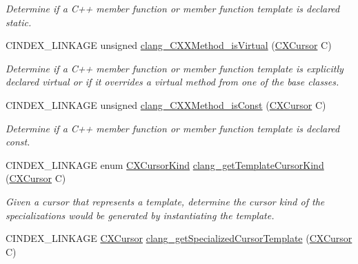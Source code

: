 \begin{DoxyCompactItemize}
\begin{DoxyCompactList}\small\item\em Determine if a C++ member function or member function template is declared \textquotesingle{}static\textquotesingle{}. \end{DoxyCompactList}\item 
\mbox{\label{group__CINDEX__CPP_gacd412f761b0622d6ea873f2ab21812e3}} 
C\+I\+N\+D\+E\+X\+\_\+\+L\+I\+N\+K\+A\+GE unsigned \mbox{\hyperlink{group__CINDEX__CPP_gacd412f761b0622d6ea873f2ab21812e3}{clang\+\_\+\+C\+X\+X\+Method\+\_\+is\+Virtual}} (\mbox{\hyperlink{structCXCursor}{C\+X\+Cursor}} C)
\begin{DoxyCompactList}\small\item\em Determine if a C++ member function or member function template is explicitly declared \textquotesingle{}virtual\textquotesingle{} or if it overrides a virtual method from one of the base classes. \end{DoxyCompactList}\item 
\mbox{\label{group__CINDEX__CPP_ga89a96f6eaae57508edc968611ac8969e}} 
C\+I\+N\+D\+E\+X\+\_\+\+L\+I\+N\+K\+A\+GE unsigned \mbox{\hyperlink{group__CINDEX__CPP_ga89a96f6eaae57508edc968611ac8969e}{clang\+\_\+\+C\+X\+X\+Method\+\_\+is\+Const}} (\mbox{\hyperlink{structCXCursor}{C\+X\+Cursor}} C)
\begin{DoxyCompactList}\small\item\em Determine if a C++ member function or member function template is declared \textquotesingle{}const\textquotesingle{}. \end{DoxyCompactList}\item 
C\+I\+N\+D\+E\+X\+\_\+\+L\+I\+N\+K\+A\+GE enum \mbox{\hyperlink{group__CINDEX_gaaccc432245b4cd9f2d470913f9ef0013}{C\+X\+Cursor\+Kind}} \mbox{\hyperlink{group__CINDEX__CPP_gafe1f32ddd935c20f0f455d47c05ec5ab}{clang\+\_\+get\+Template\+Cursor\+Kind}} (\mbox{\hyperlink{structCXCursor}{C\+X\+Cursor}} C)
\begin{DoxyCompactList}\small\item\em Given a cursor that represents a template, determine the cursor kind of the specializations would be generated by instantiating the template. \end{DoxyCompactList}\item 
C\+I\+N\+D\+E\+X\+\_\+\+L\+I\+N\+K\+A\+GE \mbox{\hyperlink{structCXCursor}{C\+X\+Cursor}} \mbox{\hyperlink{group__CINDEX__CPP_gad3f78435e7ee316b3d9e704c9d42ec4b}{clang\+\_\+get\+Specialized\+Cursor\+Template}} (\mbox{\hyperlink{structCXCursor}{C\+X\+Cursor}} C)

\end{DoxyCompactItemize}

